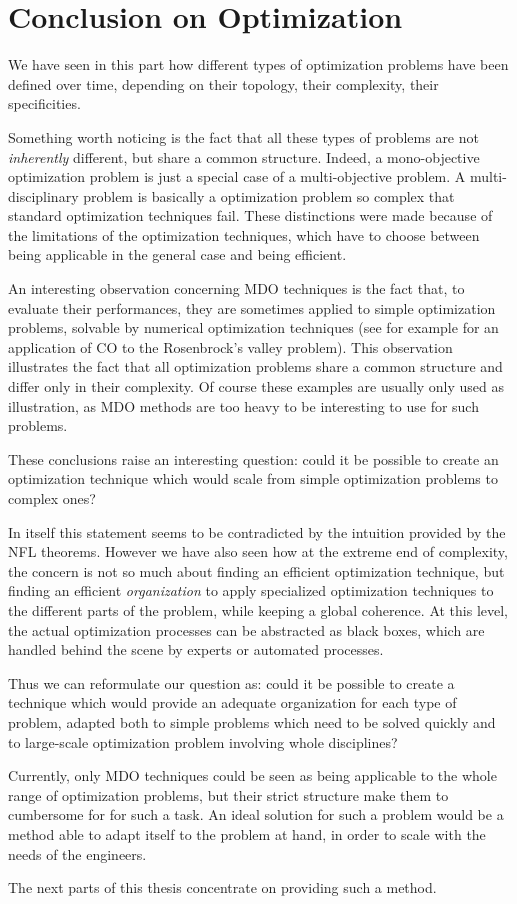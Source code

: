 \chapter{Conclusion on Optimization}

We have seen in this part how different types of optimization problems have been defined over time, depending on their topology, their complexity, their specificities.

Something worth noticing is the fact that all these types of problems are not \emph{inherently} different, but share a common structure. Indeed, a mono-objective optimization problem is just a special case of a multi-objective problem. A multi-disciplinary problem is basically a optimization problem so complex that standard optimization techniques fail. These distinctions were made because of the limitations of the optimization techniques, which have to choose between being applicable in the general case and being efficient.

An interesting observation concerning MDO techniques is the fact that, to evaluate their performances, they are sometimes applied to simple optimization problems, solvable by numerical optimization techniques (see for example \cite{Kroo:1994:MOM} for an application of CO to the Rosenbrock's valley problem). This observation illustrates the fact that all optimization problems share a common structure and differ only in their complexity. Of course these examples are usually only used as illustration, as MDO methods are too heavy to be interesting to use for such problems.

These conclusions raise an interesting question: could it be possible to create an optimization technique which would scale from simple optimization problems to complex ones?

In itself this statement seems to be contradicted by the intuition provided by the NFL theorems. However we have also seen how at the extreme end of complexity, the concern is not so much about finding an efficient optimization technique, but finding an efficient \emph{organization} to apply specialized optimization techniques to the different parts of the problem, while keeping a global coherence.
At this level, the actual optimization processes can be abstracted as black boxes, which are handled behind the scene by experts or automated processes.

Thus we can reformulate our question as: could it be possible to create a technique which would provide an adequate organization for each type of problem, adapted both to simple problems which need to be solved quickly and to large-scale optimization problem involving whole disciplines?

Currently, only MDO techniques could be seen as being applicable to the whole range of optimization problems, but their strict structure make them to cumbersome for for such a task.
An ideal solution for such a problem would be a method able to adapt itself to the problem at hand, in order to scale with the needs of the engineers.

The next parts of this thesis concentrate on providing such a method.

